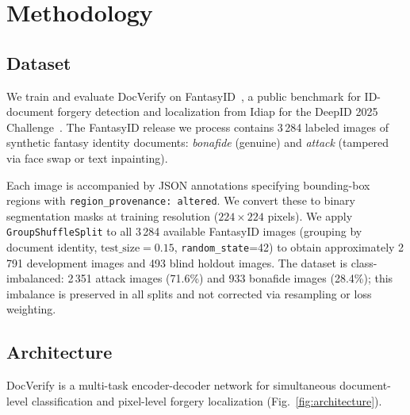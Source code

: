 
\section{Methodology}
\label{sec:method}

\subsection{Dataset}
\label{subsec:dataset}

We train and evaluate DocVerify on FantasyID~\citep{fantasyid2024}, a public
benchmark for ID-document forgery detection and localization from Idiap for the
DeepID 2025 Challenge~\citep{deepid2025challenge}. The FantasyID release we
process contains 3\,284 labeled images of synthetic fantasy identity documents: \textit{bonafide}
(genuine) and \textit{attack} (tampered via face swap or text inpainting).

Each image is accompanied by JSON annotations specifying bounding-box regions
with \texttt{region\_provenance: altered}. We convert these to binary
segmentation masks at training resolution ($224 \times 224$ pixels). We
apply \texttt{GroupShuffleSplit} to all 3\,284 available FantasyID images
(grouping by document identity, $\text{test\_size}=0.15$,
\texttt{random\_state}=42) to obtain approximately 2\,791 development images
and 493 blind holdout images.  The dataset is class-imbalanced:
2\,351 attack images (71.6\%) and 933 bonafide images (28.4\%); this
imbalance is preserved in all splits and not corrected via resampling or
loss weighting. 

\subsection{Architecture}
\label{subsec:arch}

DocVerify is a multi-task encoder-decoder network for simultaneous
document-level classification and pixel-level forgery localization
(Fig.~\ref{fig:architecture}).

